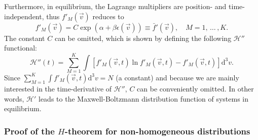 Furthermore, in equilibrium, the Lagrange multipliers are position- and time-independent,
thus $f'_M(\vec{v})$
reduces to
%
\begin{equation}\label{eq:fbardef}
    f'_M(\vec{v})=C\exp\left(\alpha+\beta \epsilon(\vec{v})\right)
    \equiv \bar{f}'(\vec{v}),\quad M=1,\,\dots\,,K.
\end{equation} 
%
The constant $C$ can be omitted, which is shown by defining the following $\mathcal{H}''$
functional:
%
\begin{equation}\label{CH3}
   \mathcal{H}''(t)=\sum_{M=1}^{K}\int \left[f'_M(\vec{v},t)
    \ln f'_M(\vec{v},t)-f'_M(\vec{v},t)\right]\mathrm{d}^3v.
\end{equation}
%
Since $\sum_{M=1}^{K} \int f'_M(\vec{v},t)\mathrm{d}^3v =N$ (a constant)
and because we are mainly interested in the time-derivative of $\mathcal{H}''$,
$C$ can be conveniently omitted. In other words, $\mathcal{H}'$ leads to the Maxwell-Boltzmann
distribution function of systems in equilibrium.

\subsubsection{Proof of the $H$-theorem for non-homogeneous distributions}

